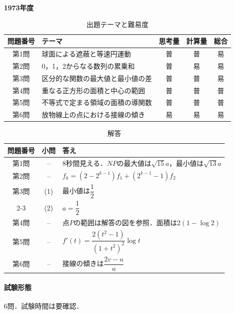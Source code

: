 \documentclass[../../main.tex]{subfiles}
\begin{document}
\begin{center}
  {\fontsize{48pt}{58pt}\selectfont \textbf{1973}\normalsize\textbf{年度}}
\end{center}

\begin{table}[htb]
  \centering
  \caption{出題テーマと難易度}
  \begin{tabular}{|c|p{6.2cm}|c|c|c|}
    \hline
    \textbf{問題番号} & \textbf{テーマ} & \textbf{思考量} & \textbf{計算量} & \textbf{総合} \\
    \hline
    第1問 & 球面による遮蔽と等速円運動 & 普 & 普 & 易 \\
    \hline
    第2問 & 0，1，2からなる数列の累乗和 & 普 & 易 & 易 \\
    \hline
    第3問 & 区分的な関数の最大値と最小値の差 & 普 & 普 & 易 \\
    \hline
    第4問 & 重なる正方形の面積と中心の範囲 & 普 & 普 & 普 \\
    \hline
    第5問 & 不等式で定まる領域の面積の導関数 & 普 & 普 & 普 \\
    \hline
    第6問 & 放物線上の点における接線の傾き & 易 & 易 & 易 \\
    \hline
  \end{tabular}
\end{table}

\begin{table}[htb]
  \centering
  \caption{解答}
  \renewcommand{\arraystretch}{1.4}
  \begin{tabular}{|c|c|p{9cm}|}
    \hline
    \textbf{問題番号} & \textbf{小問} & \textbf{答え} \\
    \hline
    第1問 & -- & $8$秒間見える．$NP$の最大値は$\sqrt{15}a$，最小値は$\sqrt{13}a$ \\
    \hline
    第2問 & -- & $f_k=(2-2^{k-1})f_1+(2^{k-1}-1)f_2$ \\
    \hline
    第3問 & (1) & 最小値は$\dfrac{1}{2}$ \\
    \cline{2-3}
    & (2) & $a=\dfrac{1}{2}$ \\
    \hline
    第4問 & -- & 点$P$の範囲は解答の図を参照．面積は$2(1-\log 2)$ \\
    \hline
    第5問 & -- & $f'(t)=\dfrac{2(t^2-1)}{(1+t^2)^2}\log t$ \\
    \hline
    第6問 & -- & 接線の傾きは$\dfrac{2v-u}{u}$ \\
    \hline
  \end{tabular}
\end{table}

\paragraph{試験形態}
6問．試験時間は要確認．
\end{document}
